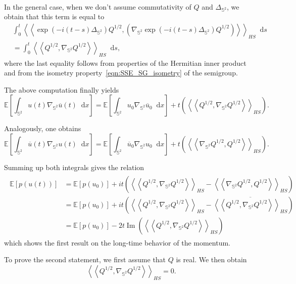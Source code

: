 \documentclass[11pt]{amsart}
\newcommand{\E}{{\mathbb E}}
\newcommand{\IS}{\mathbb{S}}
\newcommand*\dd{\mathop{}\!\mathrm{d}}
\newcommand{\Deltalb}{\Delta_{\IS^2}}
\newcommand{\nablalb}{\nabla_{\IS^{2}}}
\begin{document}
\begin{appendixproof}
\begin{enumerate}[label=\roman*)]
\begin{align}
\end{align}
In the general case, when we don't assume commutativity of $Q$ and $\Deltalb$, we obtain that this term is equal to
\begin{align*}
	&\int_{0}^{t}\left<\left<\exp{(-i(t-s)\Deltalb)Q^{1/2}},\left(\nablalb \exp{(-i(t-s)\Deltalb)}Q^{1/2}\right)\right>\right>_{HS}\dd s\\
	&=\int_{0}^{t}\left<\left<Q^{1/2},\nablalb Q^{1/2}\right>\right>_{HS}\dd s,
\end{align*}
where the last equality follows from properties of the Hermitian inner product and from the isometry property~\eqref{eqn:SSE_SG_isometry} of the semigroup.

The above computation finally yields
\begin{equation*}
	\E\left[\int_{\IS^2} u(t)\nablalb \overline u(t)\dd x\right] = \E\left[\int_{\IS^2} u_0\nablalb \overline u_0\dd x\right]+t\left(\left<\left<Q^{1/2},\nablalb Q^{1/2}\right>\right>_{HS}\right).
\end{equation*}

Analogously, one obtains
\begin{equation*}
	\E\left[\int_{\IS^2} \overline{u}(t)\nablalb u(t)\dd x\right] = \E\left[\int_{\IS^2} \overline{u}_0\nablalb  u_0\dd x\right]+t\left(\left<\left<\nablalb Q^{1/2}, Q^{1/2}\right>\right>_{HS}\right).
\end{equation*}

Summing up both integrals gives the relation
\begin{align}
    \begin{split}\label{anotherequation}
	\E\left[p(u(t))\right] &= \E\left[ p(u_0)\right]+it\left(\left<\left< Q^{1/2}, \nablalb Q^{1/2}\right>\right>_{HS}-\left<\left<\nablalb Q^{1/2}, Q^{1/2}\right>\right>_{HS}\right)\\
	&= \E\left[ p(u_0)\right]+it\left(\left<\left< Q^{1/2}, \nablalb Q^{1/2}\right>\right>_{HS}-\overline{\left<\left< Q^{1/2}, \nablalb Q^{1/2}\right>\right>_{HS}}\right)\\
	&= \E\left[ p(u_0)\right]-2t\operatorname{Im}\left(\left<\left< Q^{1/2}, \nablalb Q^{1/2}\right>\right>_{HS}\right)
    \end{split}
\end{align}
which shows the first result on the long-time behavior of the momentum.

To prove the second statement, we first assume that $Q$ is real. We then obtain
$$
\left<\left<Q^{1/2},\nablalb Q^{1/2}\right>\right>_{HS} = 0.
$$


\end{enumerate}
\end{appendixproof}
\end{document}
